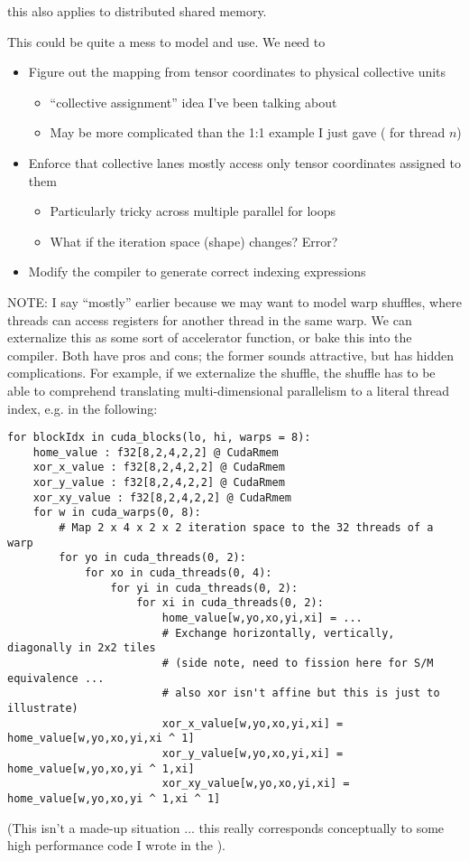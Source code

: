  this also applies to distributed shared memory.

\filbreak
This could be quite a mess to model and use.
We need to
\begin{itemize}
  \item Figure out the mapping from tensor coordinates to physical collective units
  \begin{itemize}
    \item {} ``collective assignment'' idea I've been talking about
    \item May be more complicated than the 1:1 example I just gave (\lighttt{[n]} for thread $n$)
  \end{itemize}
  \item Enforce that collective lanes mostly access only tensor coordinates assigned to them
  \begin{itemize}
    \item Particularly tricky across multiple parallel for loops
    \item What if the iteration space (shape) changes? Error?
  \end{itemize}
  \item Modify the compiler to generate correct indexing expressions
\end{itemize}

\filbreak
NOTE: I say ``mostly'' earlier because we may want to model warp shuffles, where threads can access registers for another thread in the same warp.
We can externalize this as some sort of accelerator function, or bake this into the compiler.
Both have pros and cons; the former sounds attractive, but has hidden complications.
For example, if we externalize the shuffle, the shuffle has to be able to comprehend translating multi-dimensional parallelism to a literal thread index, e.g. in the following:

{\color{lightttColor}
\begin{verbatim}
for blockIdx in cuda_blocks(lo, hi, warps = 8):
    home_value : f32[8,2,4,2,2] @ CudaRmem
    xor_x_value : f32[8,2,4,2,2] @ CudaRmem
    xor_y_value : f32[8,2,4,2,2] @ CudaRmem
    xor_xy_value : f32[8,2,4,2,2] @ CudaRmem
    for w in cuda_warps(0, 8):
        # Map 2 x 4 x 2 x 2 iteration space to the 32 threads of a warp
        for yo in cuda_threads(0, 2):
            for xo in cuda_threads(0, 4):
                for yi in cuda_threads(0, 2):
                    for xi in cuda_threads(0, 2):
                        home_value[w,yo,xo,yi,xi] = ...
                        # Exchange horizontally, vertically, diagonally in 2x2 tiles
                        # (side note, need to fission here for S/M equivalence ...
                        # also xor isn't affine but this is just to illustrate)
                        xor_x_value[w,yo,xo,yi,xi] = home_value[w,yo,xo,yi,xi ^ 1]
                        xor_y_value[w,yo,xo,yi,xi] = home_value[w,yo,xo,yi ^ 1,xi]
                        xor_xy_value[w,yo,xo,yi,xi] = home_value[w,yo,xo,yi ^ 1,xi ^ 1]
\end{verbatim}
}
(This isn't a made-up situation ... this really corresponds conceptually to some high performance code I wrote in the ).

